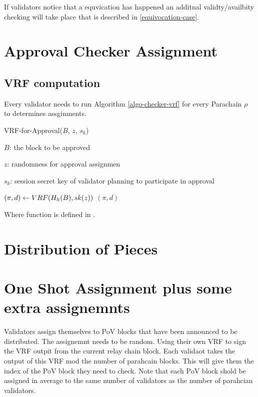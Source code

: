 If validators notice that a equvication has happened an additnal validty/availbity checking will take place that is described in \ref{equivocation-case}. 

\section{Approval Checker Assignment}
\subsection{VRF computation}

Every validator needs to run Algorithm \ref{algo-checker-vrf} for every Parachain $\rho$ to determines assginments.

\begin{algorithm}
  \caption[VRF-for-Approval]{\sc VRF-for-Approval($B$, $z$, $s_k$)}
  \label{algo-checker-vrf}
  \begin{algorithmic}[1]
  \Require

    $B$: the block to be approved 

    $z$: randomness for approval assignmen

    $s_k$: session secret key of validator planning to participate in approval

    \State $(\pi, d) \leftarrow \sc{VRF}(H_h(B),sk(z))$
    \State \Return $(\pi,d)$
  \end{algorithmic}
\end{algorithm}

\begin{algorithm}
  \Require{}
  \caption[]{\sc }
  \begin{algorithmic}[1]
    \State
  \end{algorithmic}
\end{algorithm}

Where  function is defined in \cite{polkadot-crypto-spec}.

\section{Distribution of Pieces}\label{distribute-piece}

\section{One Shot Assignment plus some extra assignemnts}\label{shot-assignment}
Validators assign themselves to PoV blocks that have been announced to be distributed. The assignemnt needs to be random. Using their own VRF to sign the VRF outpit from the current relay chain block. Each validaot takes the output of this VRF mod the number of parahcain blocks. This will give them the index of the PoV block they need to check. Note that each PoV block shold be assigned in average to the same number of validators as the number of parahcian validators.

